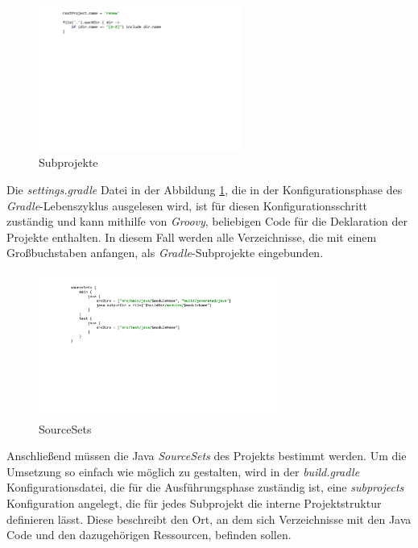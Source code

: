 	\begin{figure}[h!]
	  \centering
	  \includegraphics[width=0.6\textwidth]{material/images/settingsgradle.pdf}
	  \caption{Subprojekte}
	  \label{fig:subprojekte}
	\end{figure}

 	Die \textit{settings.gradle} Datei in der Abbildung \ref{fig:subprojekte}, die in der Konfigurationsphase des \textit{Gradle}-Lebenszyklus ausgelesen wird, ist für diesen Konfigurationsschritt zuständig und kann mithilfe von \textit{Groovy}, beliebigen Code für die Deklaration der Projekte enthalten. In diesem Fall werden alle Verzeichnisse, die mit einem Großbuchstaben anfangen, als \textit{Gradle}-Subprojekte eingebunden.\bigbreak

	\begin{figure}[h!]
	  \centering
	  \includegraphics[width=0.7\textwidth]{material/images/sourcesets.pdf}
	  \caption{SourceSets}
	  \label{fig:Source_Sets}
	\end{figure}

 	Anschließend müssen die Java \textit{SourceSets} des Projekts bestimmt werden. Um die Umsetzung so einfach wie möglich zu gestalten, wird in der \textit{build.gradle} Konfigurationsdatei, die für die Ausführungsphase zuständig ist, eine \textit{subprojects} Konfiguration angelegt, die für jedes Subprojekt die interne Projektstruktur definieren lässt. Diese beschreibt den Ort, an dem sich  Verzeichnisse mit den Java Code und den dazugehörigen Ressourcen, befinden sollen.\bigbreak

